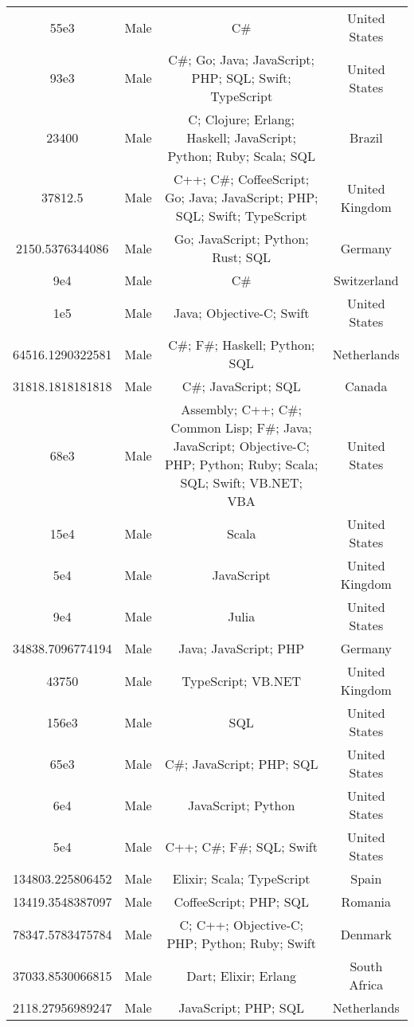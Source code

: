 \begin{center}
\begin{tabular}{ |c|c|c|c| }
55e3  &  Male  &  C\#  &  United States  \\ 
93e3  &  Male  &  C\#; Go; Java; JavaScript; PHP; SQL; Swift; TypeScript  &  United States  \\ 
23400  &  Male  &  C; Clojure; Erlang; Haskell; JavaScript; Python; Ruby; Scala; SQL  &  Brazil  \\ 
37812.5  &  Male  &  C++; C\#; CoffeeScript; Go; Java; JavaScript; PHP; SQL; Swift; TypeScript  &  United Kingdom  \\ 
2150.5376344086  &  Male  &  Go; JavaScript; Python; Rust; SQL  &  Germany  \\ 
9e4  &  Male  &  C\#  &  Switzerland  \\ 
1e5  &  Male  &  Java; Objective-C; Swift  &  United States  \\ 
64516.1290322581  &  Male  &  C\#; F\#; Haskell; Python; SQL  &  Netherlands  \\ 
31818.1818181818  &  Male  &  C\#; JavaScript; SQL  &  Canada  \\ 
68e3  &  Male  &  Assembly; C++; C\#; Common Lisp; F\#; Java; JavaScript; Objective-C; PHP; Python; Ruby; Scala; SQL; Swift; VB.NET; VBA  &  United States  \\ 
15e4  &  Male  &  Scala  &  United States  \\ 
5e4  &  Male  &  JavaScript  &  United Kingdom  \\ 
9e4  &  Male  &  Julia  &  United States  \\ 
34838.7096774194  &  Male  &  Java; JavaScript; PHP  &  Germany  \\ 
43750  &  Male  &  TypeScript; VB.NET  &  United Kingdom  \\ 
156e3  &  Male  &  SQL  &  United States  \\ 
65e3  &  Male  &  C\#; JavaScript; PHP; SQL  &  United States  \\ 
6e4  &  Male  &  JavaScript; Python  &  United States  \\ 
5e4  &  Male  &  C++; C\#; F\#; SQL; Swift  &  United States  \\ 
134803.225806452  &  Male  &  Elixir; Scala; TypeScript  &  Spain  \\ 
13419.3548387097  &  Male  &  CoffeeScript; PHP; SQL  &  Romania  \\ 
78347.5783475784  &  Male  &  C; C++; Objective-C; PHP; Python; Ruby; Swift  &  Denmark  \\ 
37033.8530066815  &  Male  &  Dart; Elixir; Erlang  &  South Africa  \\ 
2118.27956989247  &  Male  &  JavaScript; PHP; SQL  &  Netherlands  \\ 

\end{tabular}
\end{center}
